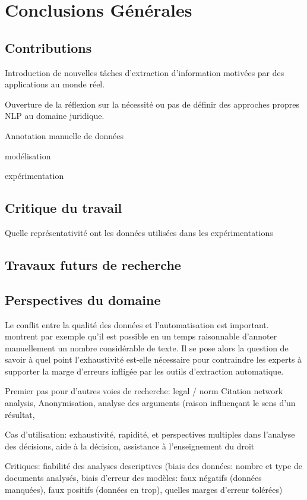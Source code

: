 \chapter*{Conclusions Générales}
\label{chap:conclusion}

\section{Contributions}
\label{sec:conclusion:contributions}
Introduction de nouvelles tâches d'extraction d'information motivées par des applications au monde réel.

Ouverture de la réflexion sur la nécessité ou pas de définir des approches propres NLP au domaine juridique.

Annotation manuelle de données

modélisation

expérimentation


\section{Critique du travail}
\label{sec:conclusion:critique}
Quelle représentativité ont les données utilisées dans les expérimentations

\section{Travaux futurs de recherche}
\label{sec:conclusion:extensions}

\section{Perspectives du domaine}
\label{sec:conclusion:perspectives}

Le conflit entre la qualité des données et l'automatisation est important. \cite{Galgani2015lexa} montrent par exemple qu'il est possible en un temps raisonnable d'annoter manuellement un nombre considérable de texte. Il se pose alors la question de savoir à quel point l'exhaustivité est-elle nécessaire pour contraindre les experts à supporter la marge d'erreurs infligée par les outils d'extraction automatique.

Premier pas pour d'autres voies de recherche: legal / norm Citation network analysis, Anonymisation, analyse des arguments (raison influençant le sens d'un résultat, 

Cas d'utilisation: exhaustivité, rapidité, et perspectives multiples dans l'analyse des décisions, aide à la décision, assistance à l'enseignement du droit

Critiques: fiabilité des analyses descriptives (biais des données: nombre et type de documents analysés, biais d'erreur des modèles: faux négatifs (données manquées), faux positifs (données en trop), quelles marges d'erreur tolérées)
